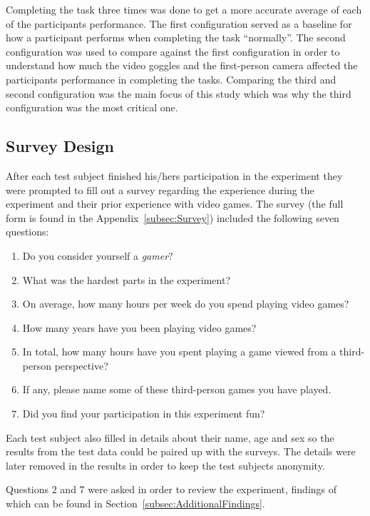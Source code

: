 \documentclass[runningheads,a4paper,oribibl]{llncs}
\begin{document}
Completing the task three times was done to get a more accurate average of each of the participants performance. The first configuration served as a baseline for how a participant performs when completing the task ``normally''. The second configuration was used to compare against the first configuration in order to understand how much the video goggles and the first-person camera affected the participants performance in completing the tasks. Comparing the third and second configuration was the main focus of this study which was why the third configuration was the most critical one.















\subsection{Survey Design}
After each test subject finished his/hers participation in the experiment they were prompted to fill out a survey regarding the experience during the experiment and their prior experience with video games. The survey (the full form is found in the Appendix~\ref{subsec:Survey}) included the following seven questions:
\begin{enumerate}
	\item Do you consider yourself a \emph{gamer}?
	\item What was the hardest parts in the experiment?
	\item On average, how many hours per week do you spend playing video games?
	\item How many years have you been playing video games?
	\item In total, how many hours have you spent playing a game viewed from a third-person perspective?
	\item If any, please name some of these third-person games you have played.
	\item Did you find your participation in this experiment fun?
\end{enumerate}
Each test subject also filled in details about their name, age and sex so the results from the test data could be paired up with the surveys. The details were later removed in the results in order to keep the test subjects anonymity.

Questions 2 and 7 were asked in order to review the experiment, findings of which can be found in Section~\ref{subsec:AdditionalFindings}.
\end{document}
